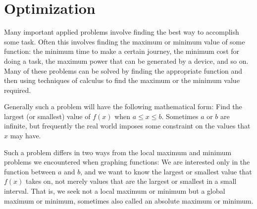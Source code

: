 \section{Optimization}{}{}
\label{sec:optimization}

Many important applied problems involve finding the best way to
accomplish some task. Often this involves finding the maximum or
minimum value of some function: the minimum time to make a certain
journey, the minimum cost for doing a task, the maximum power that can
be generated by a device, and so on. Many of these problems can be
solved by finding the appropriate function and then using techniques
of calculus to find the maximum or the minimum value required.

Generally such a problem will have the following mathematical form:
Find the largest (or smallest) value of $f(x)$ when $a\le x\le
b$. Sometimes $a$ or $b$ are infinite, but frequently the real world
imposes some constraint on the values that $x$ may have.

Such a problem differs in two ways from the local maximum and minimum
problems we encountered when graphing functions: We are interested
only in the function between $a$ and $b$, and we want to know the
largest or smallest value that $f(x)$ takes on, not merely values that
are the largest or smallest in a small interval. That is, we seek not
a local maximum or minimum but a {\dfont global\/} maximum or minimum, sometimes also called an {\dfont
absolute\/} maximum or minimum.

